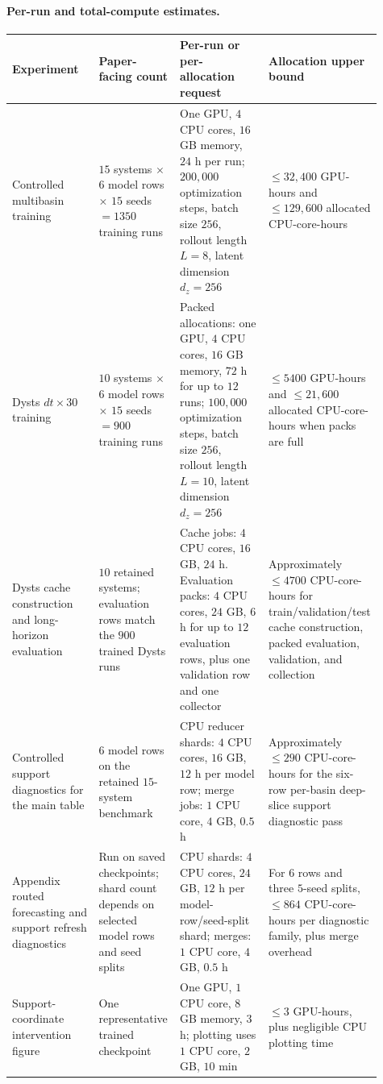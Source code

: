 \paragraph{Per-run and total-compute estimates.}
\begin{center}
\begin{tabular}{|p{0.24\linewidth}|p{0.22\linewidth}|p{0.25\linewidth}|p{0.20\linewidth}|}
\hline
\textbf{Experiment} & \textbf{Paper-facing count} & \textbf{Per-run or per-allocation request} & \textbf{Allocation upper bound} \\
\hline
Controlled multibasin training & \(15\) systems \(\times\) \(6\) model rows \(\times\) \(15\) seeds \(=1350\) training runs & One GPU, \(4\) CPU cores, \(16\) GB memory, \(24\) h per run; \(200{,}000\) optimization steps, batch size \(256\), rollout length \(L=8\), latent dimension \(d_z=256\) & \(\le 32{,}400\) GPU-hours and \(\le 129{,}600\) allocated CPU-core-hours \\
\hline
Dysts \(dt{\times}30\) training & \(10\) systems \(\times\) \(6\) model rows \(\times\) \(15\) seeds \(=900\) training runs & Packed allocations: one GPU, \(4\) CPU cores, \(16\) GB memory, \(72\) h for up to \(12\) runs; \(100{,}000\) optimization steps, batch size \(256\), rollout length \(L=10\), latent dimension \(d_z=256\) & \(\le 5400\) GPU-hours and \(\le 21{,}600\) allocated CPU-core-hours when packs are full \\
\hline
Dysts cache construction and long-horizon evaluation & \(10\) retained systems; evaluation rows match the \(900\) trained Dysts runs & Cache jobs: \(4\) CPU cores, \(16\) GB, \(24\) h. Evaluation packs: \(4\) CPU cores, \(24\) GB, \(6\) h for up to \(12\) evaluation rows, plus one validation row and one collector & Approximately \(\le 4700\) CPU-core-hours for train/validation/test cache construction, packed evaluation, validation, and collection \\
\hline
Controlled support diagnostics for the main table & \(6\) model rows on the retained \(15\)-system benchmark & CPU reducer shards: \(4\) CPU cores, \(16\) GB, \(12\) h per model row; merge jobs: \(1\) CPU core, \(4\) GB, \(0.5\) h & Approximately \(\le 290\) CPU-core-hours for the six-row per-basin deep-slice support diagnostic pass \\
\hline
Appendix routed forecasting and support refresh diagnostics & Run on saved checkpoints; shard count depends on selected model rows and seed splits & CPU shards: \(4\) CPU cores, \(24\) GB, \(12\) h per model-row/seed-split shard; merges: \(1\) CPU core, \(4\) GB, \(0.5\) h & For \(6\) rows and three \(5\)-seed splits, \(\le 864\) CPU-core-hours per diagnostic family, plus merge overhead \\
\hline
Support-coordinate intervention figure & One representative trained checkpoint & One GPU, \(1\) CPU core, \(8\) GB memory, \(3\) h; plotting uses \(1\) CPU core, \(2\) GB, \(10\) min & \(\le 3\) GPU-hours, plus negligible CPU plotting time \\
\hline
\end{tabular}
\end{center}

